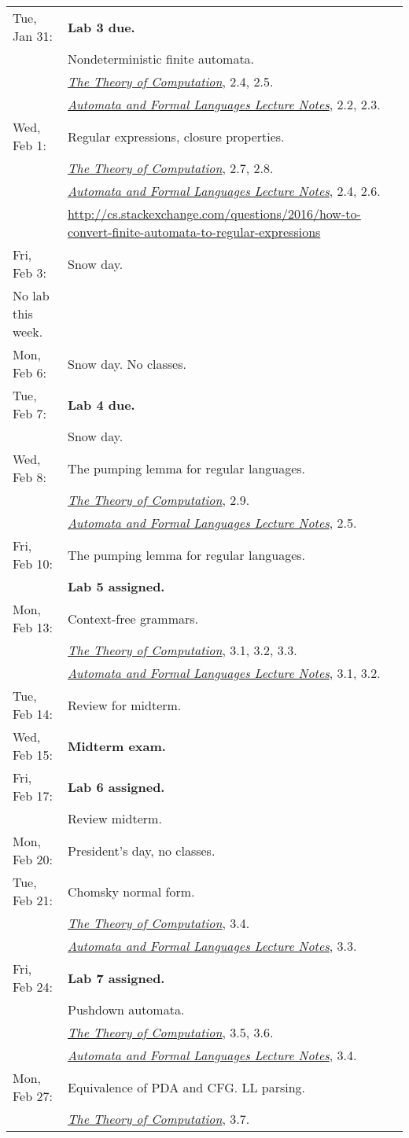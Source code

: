 \documentclass{article}
\newcommand{\theory}
           {\href{http://cg.scs.carleton.ca/~michiel/TheoryOfComputation/}
             {{\em The Theory of Computation}}}
\newcommand{\automata}
           {\href{http://users.utu.fi/jkari/automata/}
             {{\em Automata and Formal Languages Lecture Notes}}}
\begin{document}
\begin{longtable}{ll}
Tue, Jan 31:
& {\bf Lab 3 due.}
\\& Nondeterministic finite automata.
\\&\theory, 2.4, 2.5.
\\&\automata, 2.2, 2.3.
\\
Wed, Feb 1:
& Regular expressions, closure properties.
\\&\theory, 2.7,   2.8.
\\&\automata, 2.4, 2.6.
\\&\url{http://cs.stackexchange.com/questions/2016/how-to-convert-finite-automata-to-regular-expressions}
\\
Fri, Feb 3: & Snow day.
\\\hline
No lab this week.
\\
Mon, Feb 6:
& Snow day. No classes.
\\
Tue, Feb 7:
& {\bf Lab 4 due.}
\\ & Snow day.
\\
Wed, Feb 8:
& The pumping lemma for regular languages.
\\&\theory, 2.9.
\\&\automata, 2.5.
\\
Fri, Feb 10:& The pumping lemma for regular languages.
\\& {\bf Lab 5 assigned.}
\\\hline
Mon, Feb 13:
& Context-free grammars.
\\&\theory, 3.1, 3.2, 3.3.
\\&\automata, 3.1,  3.2.
\\
Tue, Feb 14:
& Review for midterm.
\\
Wed, Feb 15:
& {\bf Midterm exam.}
\\
Fri, Feb 17:
& {\bf Lab 6 assigned.}
\\&Review midterm.
\\\hline
Mon, Feb 20:&  President's day, no classes.
\\
Tue, Feb 21:
& Chomsky normal form.  \\&\theory, 3.4. \\&\automata, 3.3.
\\
Fri, Feb 24:
& {\bf Lab 7 assigned.}
\\& Pushdown automata. \\&\theory, 3.5, 3.6.  \\&\automata, 3.4.
\\\hline
Mon, Feb 27:
& Equivalence of PDA and CFG.  LL parsing. \\&\theory, 3.7.
\\

\end{longtable}
\end{document}
